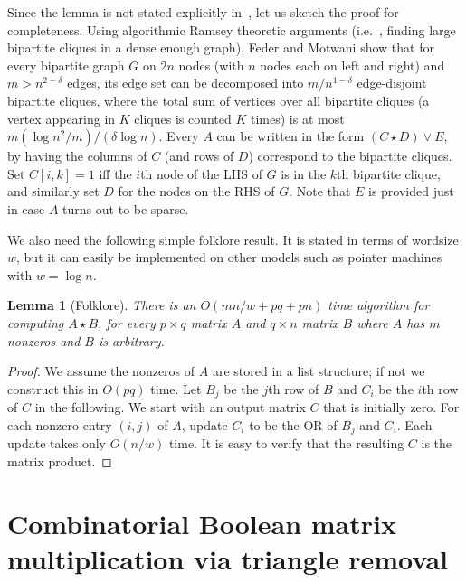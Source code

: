 \documentclass[10pt]{article}
\newtheorem{lemma}[theorem]{Lemma}
\theoremstyle{definition}
\providecommand{\ie}{i.e.\ }
\numberwithin{equation}{section}
\begin{document}
Since the lemma is not stated explicitly in~\cite{federmotwani}, let us sketch the proof for completeness. Using algorithmic Ramsey theoretic arguments (\ie, finding large bipartite cliques in a dense enough graph), Feder and Motwani show that for every bipartite graph $G$ on $2n$ nodes (with $n$ nodes each on left and right) and $m>n^{2-\delta}$ edges, its edge set can be decomposed into $m/n^{1-\delta}$ edge-disjoint bipartite cliques, where the total sum of vertices over all bipartite cliques (a vertex appearing in $K$ cliques is counted $K$ times) is at most $m (\log n^2/m)/(\delta \log n)$. Every $A$ can be written in the form $(C \star D) \vee E$, by having the columns of $C$ (and rows of $D$) correspond to the bipartite cliques. Set $C[i,k]=1$ iff the $i$th node of the LHS of $G$ is in the $k$th bipartite clique, and similarly set $D$ for the nodes on the RHS of $G$. Note that  $E$ is provided just in case $A$ turns out to be sparse.

We also need the following simple folklore result. It is stated in terms of wordsize $w$, but it can easily be implemented on other models such as pointer machines with $w=\log n$.

\begin{lemma}[Folklore]\label{sparseword} There is an $O(m n/w + pq + pn)$ time algorithm for computing $A \star B$, for every $p \times q$ matrix $A$ and $q \times n$  matrix $B$ where $A$ has $m$ nonzeros and $B$ is arbitrary.\end{lemma}

\begin{proof} We assume the nonzeros of $A$ are stored in a list structure; if not we construct this in $O(pq)$ time. Let $B_j$ be the $j$th row of $B$ and $C_i$ be the $i$th row of $C$ in the following. We start with an output matrix $C$ that is initially zero. For each nonzero entry $(i,j)$ of $A$, update $C_i$ to be the OR of $B_j$ and $C_i$. Each update takes only $O(n/w)$ time. It is easy to verify that the resulting $C$ is the matrix product.\end{proof}

\section{Combinatorial Boolean matrix multiplication via triangle removal}
\end{document}
